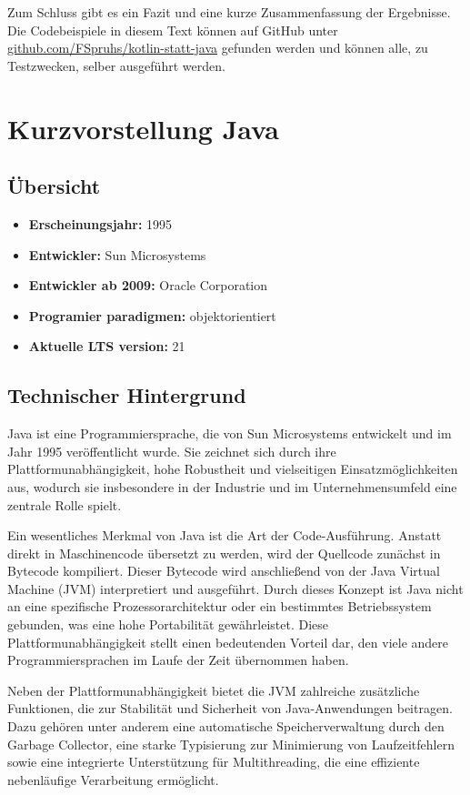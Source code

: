 \documentclass[11pt]{article}
\begin{document}
    Zum Schluss gibt es ein Fazit und eine kurze Zusammenfassung der Ergebnisse.
    Die Codebeispiele in diesem Text können auf GitHub unter \url{github.com/FSpruhs/kotlin-statt-java} gefunden werden und können alle, zu Testzwecken, selber ausgeführt werden.

    \section{Kurzvorstellung Java}

    \subsection{Übersicht}
    \begin{itemize}
        \item \textbf{Erscheinungsjahr:} 1995
        \item \textbf{Entwickler:} Sun Microsystems
        \item \textbf{Entwickler ab 2009:} Oracle Corporation
        \item \textbf{Programier paradigmen:} objektorientiert
        \item \textbf{Aktuelle LTS version:} 21
    \end{itemize}

    \subsection{Technischer Hintergrund}
    Java ist eine Programmiersprache, die von Sun Microsystems entwickelt und im Jahr 1995 veröffentlicht wurde.
    Sie zeichnet sich durch ihre Plattformunabhängigkeit, hohe Robustheit und vielseitigen Einsatzmöglichkeiten aus,
    wodurch sie insbesondere in der Industrie und im Unternehmensumfeld eine zentrale Rolle spielt.

    Ein wesentliches Merkmal von Java ist die Art der Code-Ausführung.
    Anstatt direkt in Maschinencode übersetzt zu werden, wird der Quellcode zunächst in Bytecode kompiliert.
    Dieser Bytecode wird anschließend von der Java Virtual Machine (JVM) interpretiert und ausgeführt.
    Durch dieses Konzept ist Java nicht an eine spezifische Prozessorarchitektur oder ein
    bestimmtes Betriebssystem gebunden, was eine hohe Portabilität gewährleistet.
    Diese Plattformunabhängigkeit stellt einen bedeutenden Vorteil dar, den
    viele andere Programmiersprachen im Laufe der Zeit übernommen haben.

    Neben der Plattformunabhängigkeit bietet die JVM zahlreiche zusätzliche
    Funktionen, die zur Stabilität und Sicherheit von Java-Anwendungen beitragen.
    Dazu gehören unter anderem eine automatische Speicherverwaltung
    durch den Garbage Collector, eine starke Typisierung zur Minimierung
    von Laufzeitfehlern sowie eine integrierte Unterstützung für Multithreading,
    die eine effiziente nebenläufige Verarbeitung ermöglicht. \cite[51 - 54]{insel}
\end{document}
